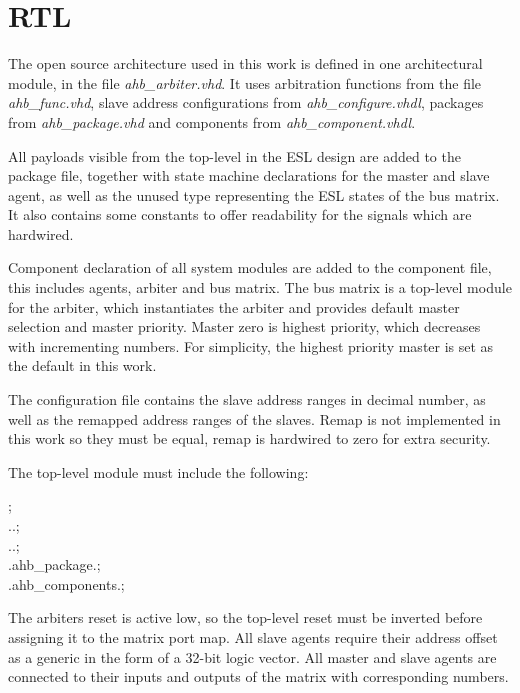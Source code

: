 \section{RTL}
The open source architecture used in this work is defined in one architectural module, in the file \textit{ahb\_arbiter.vhd}. It uses arbitration functions from the file \textit{ahb\_func.vhd}, slave address configurations from \textit{ahb\_configure.vhdl}, packages from \textit{ahb\_package.vhd} and components from \textit{ahb\_component.vhdl}. \par
All payloads visible from the top-level in the ESL design are added to the package file, together with state machine declarations for the master and slave agent, as well as the unused type representing the ESL states of the bus matrix. It also contains some constants to offer readability for the signals which are hardwired. \par
Component declaration of all system modules are added to the component file, this includes agents, arbiter and bus matrix. The bus matrix is a top-level module for the arbiter, which instantiates the arbiter and provides default master selection and master priority. Master zero is highest priority, which decreases with incrementing numbers. For simplicity, the highest priority master is set as the default in this work. \par
The configuration file contains the slave address ranges in decimal number, as well as the remapped address ranges of the slaves. Remap is not implemented in this work so they must be equal, remap is hardwired to zero for extra security. \par
The top-level module must include the following: \par
{} ; \\
 ..; \\ 
 ..; \\
 .ahb\_package.; \\
 .ahb\_components.; \par
The arbiters reset is active low, so the top-level reset must be inverted before assigning it to the matrix port map. All slave agents require their address offset as a generic in the form of a 32-bit logic vector. All master and slave agents are connected to their inputs and outputs of the matrix with corresponding numbers. 

